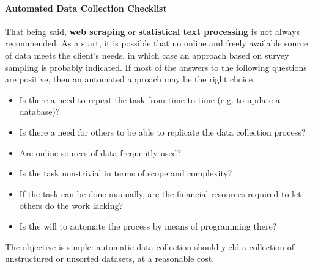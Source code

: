 \paragraph{Automated Data Collection Checklist} That being said, \textbf{web scraping} or \textbf{statistical text processing} is not always recommended. As a start, it is possible that no online and freely available source of data meets the client's needs, in which case an approach based on survey sampling is probably indicated. \newl If most of the answers to the following questions are positive, then an automated approach may be the right choice.
\begin{itemize}[noitemsep]
\item Is there a need to repeat the task from time to time (e.g. to update a database)?
\item Is there a need for others to be able to replicate the data collection process?
\item Are online sources of data frequently used?
\item Is the task non-trivial in terms of scope and complexity?
\item If the task can be done manually, are the financial resources required to let others do the work lacking?
\item Is the will to automate the process by means of programming there?
\end{itemize}
The objective is simple: automatic data collection should yield a collection of unstructured or unsorted datasets, at a reasonable cost. 
\begin{center}
    \rule{0.5\textwidth}{.4pt}
\end{center}
